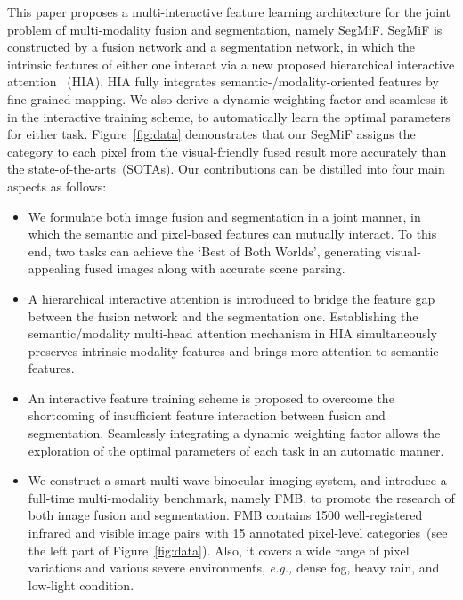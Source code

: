 \documentclass[10pt,twocolumn,letterpaper]{article}
\begin{document}
This paper proposes a multi-interactive feature learning architecture for the joint problem of multi-modality fusion and segmentation, namely SegMiF. SegMiF is constructed by a fusion network and a segmentation network, in which the intrinsic features of either one interact via a new proposed hierarchical interactive attention ~(HIA). HIA fully integrates semantic-/modality-oriented features by fine-grained mapping. We also derive a dynamic weighting factor and seamless it in the interactive training scheme, to automatically learn the optimal parameters for either task. Figure~\ref{fig:data} demonstrates that our SegMiF assigns the category to each pixel from the visual-friendly fused result more accurately than the state-of-the-arts~(SOTAs). Our contributions can be distilled into four main aspects as follows:
\begin{itemize}
	\item We formulate both image fusion and segmentation in a joint manner, in which the semantic and pixel-based features can mutually interact. To this end, two tasks can achieve the `Best of Both Worlds', generating visual-appealing fused images along with accurate scene parsing.
	\vspace{-0.2cm} 
	\item A hierarchical interactive attention  is introduced to bridge the feature gap between the fusion network and the segmentation one. Establishing the semantic/modality multi-head attention mechanism in HIA simultaneously preserves intrinsic modality features and brings more attention to semantic features.
	\vspace{-0.3cm} 	
	\item An interactive feature training scheme is proposed to overcome the shortcoming of insufficient feature interaction between fusion and segmentation. Seamlessly integrating a dynamic weighting factor allows the exploration of the optimal parameters of each task in an automatic manner.
	
	\vspace{-0.3cm} 
	\item We construct a smart multi-wave binocular imaging system, and introduce a full-time multi-modality benchmark, namely FMB, to promote the research of both image fusion and segmentation. FMB contains 1500 well-registered infrared and visible image pairs with 15 annotated pixel-level categories~(see the left part of Figure~\ref{fig:data}). Also, it covers a wide range of pixel variations and various severe environments, \emph{e.g.,} dense fog, heavy rain, and low-light condition.
	
\end{itemize}
\end{document}
